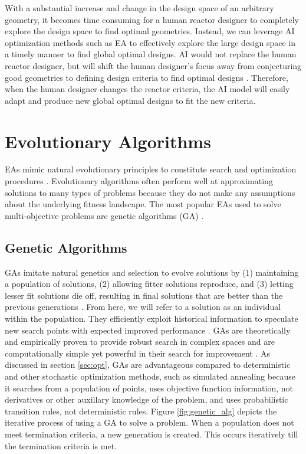 With a substantial increase and change in the design space of an arbitrary 
geometry, it becomes time consuming for a human reactor designer to completely 
explore the design space to find optimal geometries. 
Instead, we can leverage \gls{AI} optimization methods such as \gls{EA} to 
effectively explore the large design space in a timely manner to find global 
optimal designs. 
\gls{AI} would not replace the human reactor designer, but will shift the 
human designer's focus away from conjecturing good geometries to defining 
design criteria to find optimal designs \cite{sobes_artificial_2020}. 
Therefore, when the human designer changes the reactor criteria, the \gls{AI} 
model will easily adapt and produce new global optimal designs to fit the new 
criteria.  

\section{Evolutionary Algorithms} 
\glspl{EA} mimic natural evolutionary principles to constitute search and 
optimization procedures \cite{deb_multi-objective_2001}. 
Evolutionary algorithms often perform well at approximating solutions to many 
types of problems because they do not make any assumptions about the 
underlying fitness landscape.
The most popular \glspl{EA} used to solve multi-objective problems are genetic 
algorithms (GA) \cite{byrne_evolving_2014, krish_practical_2011}. 

\subsection{Genetic Algorithms}
\glspl{GA} imitate natural genetics and selection to evolve solutions 
by (1) maintaining a population of solutions, (2) allowing 
fitter solutions reproduce, and (3) letting lesser fit solutions die off, 
resulting in final solutions that are better than the previous generations 
\cite{renner_genetic_2003}. 
From here, we will refer to a solution as an individual within the population. 
They efficiently exploit historical information to speculate new search 
points with expected improved performance \cite{goldberg_genetic_1989}. 
\glspl{GA} are theoretically and empirically proven to provide robust 
search in complex spaces and are computationally simple yet powerful 
in their search for improvement \cite{goldberg_genetic_1989}. 
As discussed in section \ref{sec:opt}, \glspl{GA} are advantageous compared to 
deterministic and other stochastic optimization methods, such as simulated 
annealing because it searches from a population of points, uses objective 
function information, not derivatives or other auxillary knowledge of the 
problem, and uses probabilistic transition rules, not deterministic rules. 
Figure \ref{fig:genetic_alg} depicts the iterative process of using a \gls{GA}
to solve a problem. 
When a population does not meet termination criteria, a new generation is 
created. 
This occurs iteratively till the termination criteria is met.

